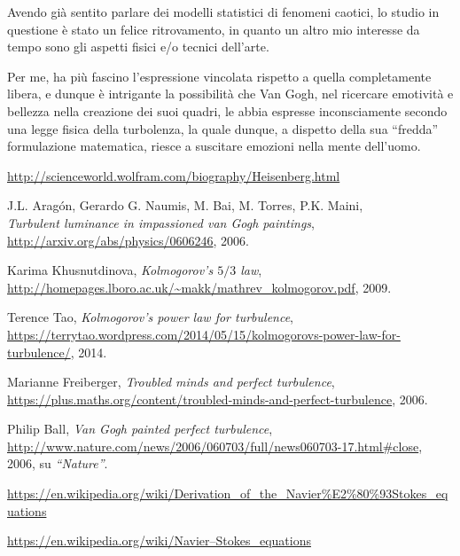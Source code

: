\documentclass[12pt,a4paper]{article}
\numberwithin{equation}{subsection}
\begin{document}
Avendo già sentito parlare dei modelli statistici di fenomeni caotici, lo studio in questione \cite{study2006} è stato un felice ritrovamento, in quanto un altro mio interesse da tempo sono gli aspetti fisici e/o tecnici dell'arte.

Per me, ha più fascino l'espressione vincolata rispetto a quella completamente libera, e dunque è intrigante la possibilità che Van Gogh, nel ricercare emotività e bellezza nella creazione dei suoi quadri, le abbia espresse inconsciamente secondo una legge fisica della turbolenza, la quale dunque, a dispetto della sua ``fredda'' formulazione matematica, riesce a suscitare emozioni nella mente dell'uomo.

\begin{thebibliography}{1}

  \url{http://scienceworld.wolfram.com/biography/Heisenberg.html}

  J.L. Aragón, Gerardo G. Naumis, M. Bai, M. Torres, P.K. Maini, \\
  \emph{Turbulent luminance in impassioned van Gogh paintings}, \\
  \url{http://arxiv.org/abs/physics/0606246}, 
  2006.

  Karima Khusnutdinova, 
  \emph{Kolmogorov's $5/3$ law}, \\
  \url{http://homepages.lboro.ac.uk/~makk/mathrev_kolmogorov.pdf},
  2009.
  
  Terence Tao,
  \emph{Kolmogorov’s power law for turbulence}, \\
  \url{https://terrytao.wordpress.com/2014/05/15/kolmogorovs-power-law-for-turbulence/}, 2014.

  Marianne Freiberger, 
  \emph{Troubled minds and perfect turbulence}, \\
  \url{https://plus.maths.org/content/troubled-minds-and-perfect-turbulence},
  2006.
  
  Philip Ball, 
  \emph{Van Gogh painted perfect turbulence}, \\
  \url{http://www.nature.com/news/2006/060703/full/news060703-17.html#close},
  2006,
  su \emph{``Nature''}.


  \url{https://en.wikipedia.org/wiki/Derivation_of_the_Navier%E2%80%93Stokes_equations}
  
  \url{https://en.wikipedia.org/wiki/Navier–Stokes_equations}


\end{thebibliography}
\end{document}
